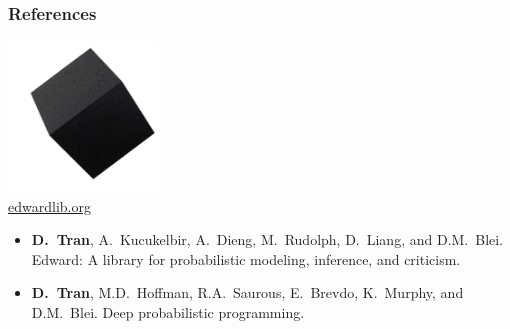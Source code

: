 \documentclass[10pt,
               xcolor={usenames,dvipsnames},
               hyperref={colorlinks,linktoc=all,citecolor=Plum,linkcolor=MidnightBlue,urlcolor=MidnightBlue},noamssymb]{beamer}
\begin{document}
\begin{frame}
\frametitle{References}
\begin{center}
\includegraphics[width=0.3\textwidth]{img/edward.png}
\\
\large \url{edwardlib.org}
\end{center}
\vspace{2ex}

\begin{itemize}
\item
\textbf{D.~Tran}, A.~Kucukelbir, A.~Dieng, M.~Rudolph, D.~Liang, and
D.M.~Blei.
Edward: A library for probabilistic modeling, inference, and criticism.
\item
\textbf{D.~Tran}, M.D.~Hoffman, R.A.~Saurous, E.~Brevdo, K.~Murphy, and
D.M.~Blei.
Deep probabilistic programming. \\
\end{itemize}
\end{frame}



\end{document}
